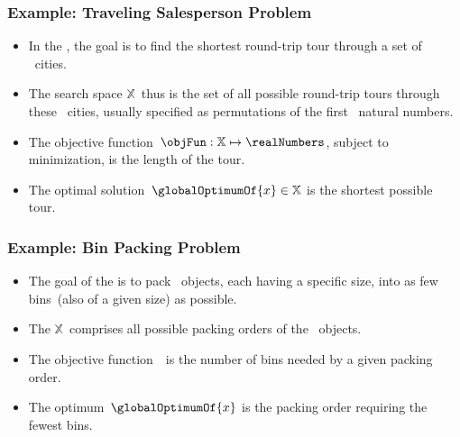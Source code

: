 \documentclass[aspectratio=169,mathserif,notheorems]{beamer}%
\gdef\searchSpace{\ensuremath{\mathbb{X}}}%
\gdef\sespel{\ensuremath{x}}%
\begin{document}
\begin{frame}%
\frametitle{Example: Traveling Salesperson Problem}%
\parbox{0.373\paperwidth}{%
\begin{itemize}%
%
\item In the \cite{ABCC2006TTSPACS,LLRKS1985TTSPAGTOCO,GP2002TTSPAIV,WCLTTCMY2014BOAAOSFFTTSP,LWLvdBTW2024ATTSPWFFAAHA,WWCTL2016GVLSTIOPSOEAP}, the goal is to find the shortest round-trip tour through a set of \scale~cities.%
%
\item<2-> The search space \searchSpace\ thus is the set of all possible round-trip tours through these \scale~cities, usually specified as permutations of the first \scale~natural numbers.%
%
\item<3-> The objective function~$\objFun:\searchSpace\mapsto\realNumbers$, subject to minimization, is the length of the tour.%
%
\item<4-> The optimal solution~$\globalOptimumOf{\sespel}\in\searchSpace$ is the shortest possible tour.%
%
\end{itemize}%
}%
%
%
%
%
\end{frame}%
%
\begin{frame}[t]%
\frametitle{Example: Bin Packing Problem}%
\begin{itemize}%
\item The goal of the  is to pack \scale~objects, each having a specific size, into as few bins~(also of a given size) as possible\cite{ZLWvdBTW2024RLSOT2RBPPWIR,ZWvdBTLTW2024RLSFTDBPAANRFFFA}.%
\item<2-> The \searchSpace\ comprises all possible packing orders of the \scale~objects.%
\item<3-> The objective function~\objFun\ is the number of bins needed by a given packing order.%
\item<4-> The optimum~$\globalOptimumOf{\sespel}$ is the packing order requiring the fewest bins.%
\end{itemize}%
%
\end{frame}%
%
\end{document}
